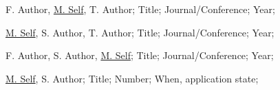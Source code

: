 \addpublication%
{
    F.\! Author, \underline{M.\! Self}, T.\! Author;%
    Title;%
    Journal/Conference;%
    Year;%
}

\addpublication%
{
    \underline{M.\! Self}, S.\! Author, T.\! Author;%
    Title;%
    Journal/Conference;%
    Year;%
}

\addpublication%
{
    F.\! Author,  S.\! Author, \underline{M.\! Self};%
    Title;%
    Journal/Conference;%
    Year;%
}

\addpatent%
{
  \underline{M.\! Self}, S.\! Author;%
  Title;%
  Number;%
  When, application state;%
}
